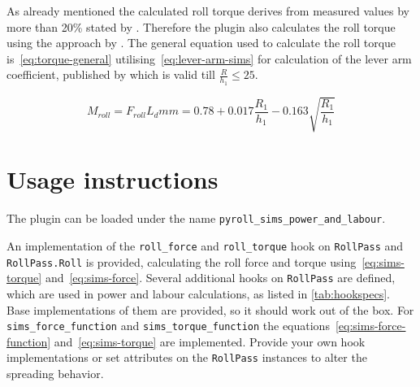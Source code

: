 \documentclass[11pt]{PyRollDocs}
\begin{document}
    As already mentioned the calculated roll torque derives from measured values by more than 20\% stated by \textcite{Weber1973}.
    Therefore the plugin also calculates the roll torque using the approach by \textcite{Weber1960}.
    The general equation used to calculate the roll torque is~\eqref{eq:torque-general} utilising~\eqref{eq:lever-arm-sims} for calculation of the lever arm coefficient,
    published by \textcite{SimsWright1962} which is valid till $\frac{R}{h_1} \leq 25$.

    \begin{subequations}
        \begin{equation}
            M_{roll} = F_{roll} L_d m
            \label{eq:torque-general}
        \end{equation}
        \begin{equation}
            m = 0.78 + 0.017 \frac{R_1}{h_1} - 0.163 \sqrt {\frac{R_1}{h_1}}
            \label{eq:lever-arm-sims}
        \end{equation}
    \end{subequations}


    \section{Usage instructions}\label{sec:usage-instructions}

    The plugin can be loaded under the name \texttt{pyroll\_sims\_power\_and\_labour}.

    An implementation of the \lstinline{roll_force} and \lstinline{roll_torque} hook on \lstinline{RollPass} and \lstinline{RollPass.Roll} is provided,
    calculating the roll force and torque using~\eqref{eq:sims-torque} and~\eqref{eq:sims-force}.
    Several additional hooks on \lstinline{RollPass} are defined, which are used in power and labour calculations, as listed in \autoref{tab:hookspecs}.
    Base implementations of them are provided, so it should work out of the box.
    For \lstinline{sims_force_function} and \lstinline{sims_torque_function} the equations~\ref{eq:sims-force-function} and~\ref{eq:sims-torque} are implemented.
    Provide your own hook implementations or set attributes on the \lstinline{RollPass} instances to alter the spreading behavior.
\end{document}
